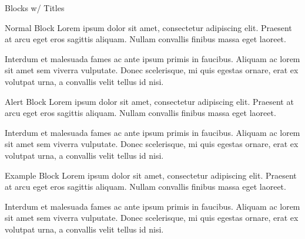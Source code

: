 \documentclass[t]{beamer}  %
\begin{document}
\begin{frame}[fragile]{Blocks w/ Titles}
  \begin{block}{Normal Block}
    Lorem ipsum dolor sit amet, consectetur adipiscing elit. Praesent at arcu eget eros sagittis aliquam. Nullam convallis finibus massa eget laoreet.

    Interdum et malesuada fames ac ante ipsum primis in faucibus. Aliquam ac lorem sit amet sem viverra vulputate. Donec scelerisque, mi quis egestas ornare, erat ex volutpat urna, a convallis velit tellus id nisi.
  \end{block}

  \begin{alertblock}{Alert Block}
    Lorem ipsum dolor sit amet, consectetur adipiscing elit. Praesent at arcu eget eros sagittis aliquam. Nullam convallis finibus massa eget laoreet.

    Interdum et malesuada fames ac ante ipsum primis in faucibus. Aliquam ac lorem sit amet sem viverra vulputate. Donec scelerisque, mi quis egestas ornare, erat ex volutpat urna, a convallis velit tellus id nisi.
  \end{alertblock}

  \begin{exampleblock}{Example Block}
    Lorem ipsum dolor sit amet, consectetur adipiscing elit. Praesent at arcu eget eros sagittis aliquam. Nullam convallis finibus massa eget laoreet.

    Interdum et malesuada fames ac ante ipsum primis in faucibus. Aliquam ac lorem sit amet sem viverra vulputate. Donec scelerisque, mi quis egestas ornare, erat ex volutpat urna, a convallis velit tellus id nisi.
  \end{exampleblock}
\end{frame}
\end{document}

